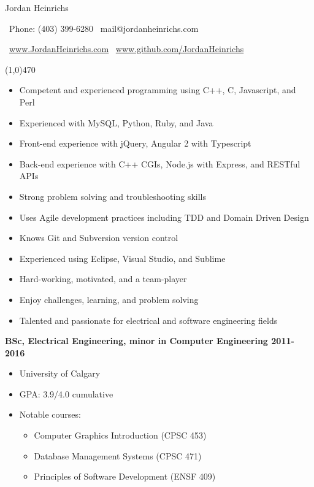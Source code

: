 \documentclass[12pt]{article}
\begin{document}
\centerline{{\Huge \sc Jordan Heinrichs}}
\medskip
\centerline{\textbullet\ Phone: (403) 399-6280 \hspace{5pt} \textbullet\ mail@jordanheinrichs.com}
\centerline{\textbullet\ \url{www.JordanHeinrichs.com}  \hspace{5pt} \textbullet\ \url{www.github.com/JordanHeinrichs}}
\noindent
\line(1,0){470}\\

\bigskip
{}
\medskip

\begin{itemize}
\item Competent and experienced programming using C++, C, Javascript, and Perl
\item Experienced with MySQL, Python, Ruby, and Java
\item Front-end experience with jQuery, Angular 2 with Typescript
\item Back-end experience with C++ CGIs, Node.js with Express, and RESTful APIs
\item Strong problem solving and troubleshooting skills
\item Uses Agile development practices including TDD and Domain Driven Design
\item Knows Git and Subversion version control
\item Experienced using Eclipse, Visual Studio, and Sublime
\item Hard-working, motivated, and a team-player
\item Enjoy challenges, learning, and problem solving
\item Talented and passionate for electrical and software engineering fields
\end{itemize}
\noindent

\bigskip
{}
\medskip

\noindent \centerline{ \bf BSc, Electrical Engineering, minor in Computer Engineering  \hfill 2011-2016}
\begin{itemize}[parsep=0pt,partopsep=0pt]
  \item University of Calgary
  \item GPA: 3.9/4.0 cumulative
  \item Notable courses:
  \begin{itemize}
    \item Computer Graphics Introduction (CPSC 453)
    \item Database Management Systems (CPSC 471)
    \item Principles of Software Development (ENSF 409)
  \end{itemize}
\end{itemize}
\end{document}
